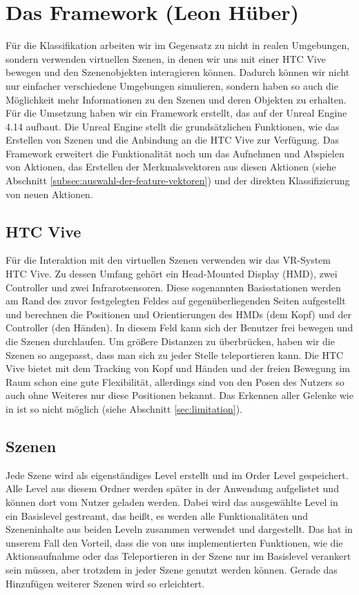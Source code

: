 
\section{Das Framework \tiny{(Leon Hüber)}}
\label{sec:framework}
Für die Klassifikation arbeiten wir im Gegensatz zu \cite{scene-grok} nicht in realen Umgebungen, sondern verwenden virtuellen Szenen, in denen wir uns mit einer HTC Vive \cite{htc-vive} bewegen und den Szenenobjekten interagieren können. Dadurch können wir nicht nur einfacher verschiedene Umgebungen simulieren, sondern haben so auch die Möglichkeit mehr Informationen zu den Szenen und deren Objekten zu erhalten.
Für die Umsetzung haben wir ein Framework erstellt, das auf der Unreal Engine 4.14 \cite{ue4} aufbaut. Die Unreal Engine stellt die grundsätzlichen Funktionen, wie das Erstellen von Szenen und die Anbindung an die HTC Vive zur Verfügung. Das Framework erweitert die Funktionalität noch um das Aufnehmen und Abspielen von Aktionen, das Erstellen der Merkmalsvektoren aus diesen Aktionen (siehe Abschnitt \ref{subsec:auswahl-der-feature-vektoren}) und der direkten Klassifizierung von neuen Aktionen.

\subsection{HTC Vive}
Für die Interaktion mit den virtuellen Szenen verwenden wir das VR-System HTC Vive. Zu dessen Umfang gehört ein Head-Mounted Display (HMD), zwei Controller und zwei Infrarotsensoren. Diese sogenannten Basisstationen werden am Rand des zuvor festgelegten Feldes auf gegenüberliegenden Seiten aufgestellt und berechnen die Positionen und Orientierungen des HMDs (dem Kopf) und der Controller (den Händen). In diesem Feld kann sich der Benutzer frei bewegen und die Szenen durchlaufen. Um größere Distanzen zu überbrücken, haben wir die Szenen so angepasst, dass man sich zu jeder Stelle teleportieren kann. Die HTC Vive bietet mit dem Tracking von Kopf und Händen und der freien Bewegung im Raum schon eine gute Flexibilität, allerdings sind von den Posen des Nutzers so auch ohne Weiteres nur diese Positionen bekannt. Das Erkennen aller Gelenke wie in \cite{scene-grok} ist so nicht möglich (siehe Abschnitt \ref{sec:limitation}).

\subsection{Szenen}
Jede Szene wird als eigenständiges Level erstellt und im Order \glqq{}Level\grqq{} gespeichert. Alle Level aus diesem Ordner werden später in der Anwendung aufgelistet und können dort vom Nutzer geladen werden. Dabei wird das ausgewählte Level in ein Basislevel \glqq{}gestreamt\grqq{}, das heißt, es werden alle Funktionalitäten und Szeneninhalte aus beiden Leveln zusammen verwendet und dargestellt. Das hat in unserem Fall den Vorteil, dass die von uns implementierten Funktionen, wie die Aktionsaufnahme oder das Teleportieren in der Szene nur im Basislevel verankert sein müssen, aber trotzdem in jeder Szene genutzt werden können. Gerade das Hinzufügen weiterer Szenen wird so erleichtert.

